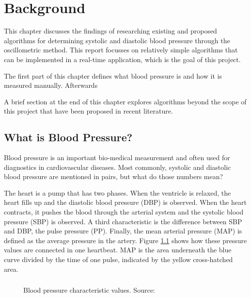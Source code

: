 \chapter{Background}\label{cp:theory}
This chapter discusses the findings of researching existing and proposed algorithms for determining systolic and diastolic blood pressure through the oscillometric method. This report focusses on relatively simple algorithms that can be implemented in a real-time application, which is the goal of this project.

The first part of this chapter defines what blood pressure is and how it is measured manually. Afterwards

A brief section at the end of this chapter explores algorithms beyond the scope of this project that have been proposed in recent literature.

\section{What is Blood Pressure?}
Blood pressure is an important bio-medical measurement and often used for diagnostics in cardiovascular diseases. Most commonly, systolic and diastolic blood pressure are mentioned in pairs, but what do those numbers mean?

The heart is a pump that has two phases. When the ventricle is relaxed, the heart fills up and the diastolic blood pressure (DBP) is observed. When the heart contracts, it pushes the blood through the arterial system and the systolic blood pressure (SBP) is observed. A third characteristic is the difference between SBP and DBP, the pulse pressure (PP). Finally, the mean arterial pressure (MAP) is defined as the average pressure in the artery. Figure \ref{fig:BP} shows how these pressure values are connected in one heartbeat. MAP is the area underneath the blue curve divided by the time of one pulse, indicated by the yellow cross-hatched area. \cite{Boron2012}\paragraph{}

\begin{figure}[h]
\centering
\caption{Blood pressure characteristic values. Source: \cite{Boron2012}}
\label{fig:BP}
\end{figure}



